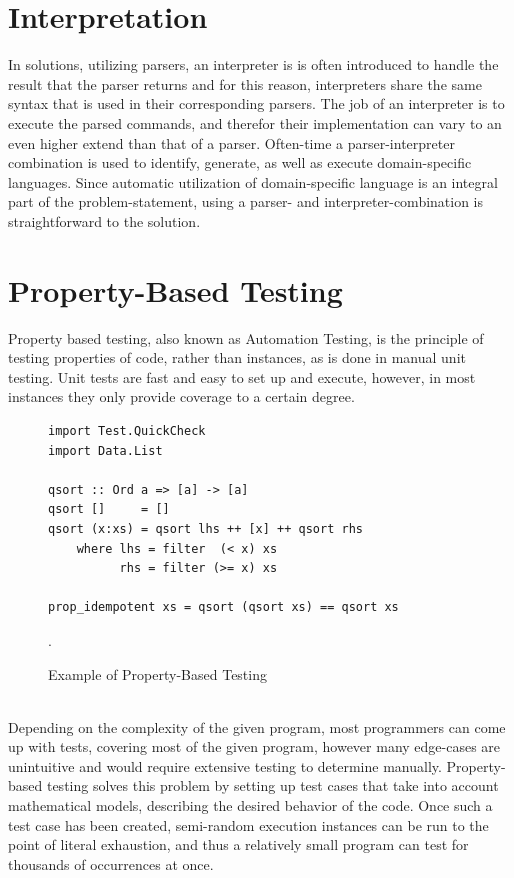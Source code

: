 \section{Interpretation}
In solutions, utilizing parsers, an interpreter is is often introduced to handle the result that the parser returns and for this reason, interpreters share the same syntax that is used in their corresponding parsers. The job of an interpreter is to execute the parsed commands, and therefor their implementation can vary to an even higher extend than that of a parser. Often-time a parser-interpreter combination is used to identify, generate, as well as execute domain-specific languages. Since automatic utilization of domain-specific language is an integral part of the problem-statement, using a parser- and interpreter-combination is straightforward to the solution.

\section{Property-Based Testing}

Property based testing, also known as Automation Testing, is the principle of testing properties of code, rather than instances, as is done in manual unit testing. Unit tests are fast and easy to set up and execute, however, in most instances they only provide coverage to a certain degree.

\begin{figure}[h]
	\centering
	\begin{lstlisting}
import Test.QuickCheck
import Data.List

qsort :: Ord a => [a] -> [a]
qsort []     = []
qsort (x:xs) = qsort lhs ++ [x] ++ qsort rhs
    where lhs = filter  (< x) xs
          rhs = filter (>= x) xs

prop_idempotent xs = qsort (qsort xs) == qsort xs
	\end{lstlisting}
	\caption{Example of Property-Based Testing~\cite{realWorldHaskell11}}.
	\label{fig:pbtEx}
\end{figure}\ \\

\noindent
Depending on the complexity of the given program, most programmers can come up with tests, covering most of the given program, however many edge-cases are unintuitive and would require extensive testing to determine manually. Property-based testing solves this problem by setting up test cases that take into account mathematical models, describing the desired behavior of the code. Once such a test case has been created, semi-random execution instances can be run to the point of literal exhaustion, and thus a relatively small program can test for thousands of occurrences at once.

